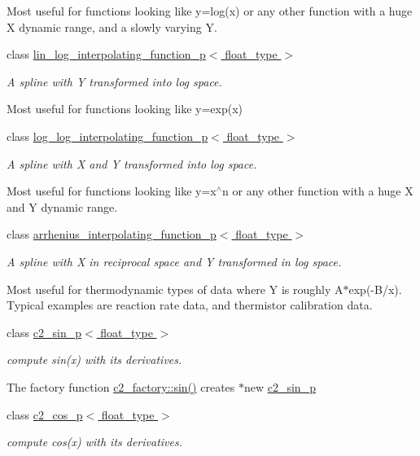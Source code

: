 \begin{DoxyCompactItemize}
\begin{DoxyCompactList}
Most useful for functions looking like y=log(x) or any other function with a huge X dynamic range, and a slowly varying Y. \end{DoxyCompactList}\item 
class \hyperlink{classlin__log__interpolating__function__p}{lin\-\_\-log\-\_\-interpolating\-\_\-function\-\_\-p$<$ float\-\_\-type $>$}
\begin{DoxyCompactList}\small\item\em A spline with Y transformed into log space.

Most useful for functions looking like y=exp(x) \end{DoxyCompactList}\item 
class \hyperlink{classlog__log__interpolating__function__p}{log\-\_\-log\-\_\-interpolating\-\_\-function\-\_\-p$<$ float\-\_\-type $>$}
\begin{DoxyCompactList}\small\item\em A spline with X and Y transformed into log space.

Most useful for functions looking like y=x$^\wedge$n or any other function with a huge X and Y dynamic range. \end{DoxyCompactList}\item 
class \hyperlink{classarrhenius__interpolating__function__p}{arrhenius\-\_\-interpolating\-\_\-function\-\_\-p$<$ float\-\_\-type $>$}
\begin{DoxyCompactList}\small\item\em A spline with X in reciprocal space and Y transformed in log space.

Most useful for thermodynamic types of data where Y is roughly A$\ast$exp(-\/\-B/x). Typical examples are reaction rate data, and thermistor calibration data. \end{DoxyCompactList}\item 
class \hyperlink{classc2__sin__p}{c2\-\_\-sin\-\_\-p$<$ float\-\_\-type $>$}
\begin{DoxyCompactList}\small\item\em compute sin(x) with its derivatives.

The factory function \hyperlink{classc2__factory_a866854d4fdd6c6678512151dbcd635a5}{c2\-\_\-factory\-::sin()} creates $\ast$new \hyperlink{classc2__sin__p}{c2\-\_\-sin\-\_\-p} \end{DoxyCompactList}\item 
class \hyperlink{classc2__cos__p}{c2\-\_\-cos\-\_\-p$<$ float\-\_\-type $>$}
\begin{DoxyCompactList}\small\item\em compute cos(x) with its derivatives.


\end{DoxyCompactList}
\end{DoxyCompactItemize}
